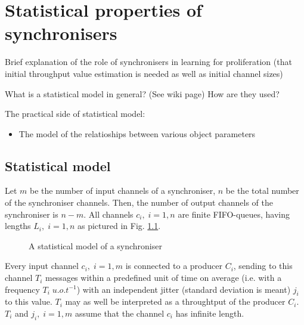 \chapter{Statistical properties of synchronisers}
Brief explanation of the role of synchronisers in learning for proliferation (that initial throughput value estimation is needed as well as initial channel sizes)

What is a statistical model in general? (See wiki page) How are they used?

The practical side of statistical model:
  \begin{itemize}
  \item The model of the relatioships between various object parameters
  \end{itemize}


\section{Statistical model}
Let $m$ be the number of input channels of a synchroniser, $n$ be the total number of the synchroniser channels. Then, the number of output channels of the synchroniser is $n-m$. All channels $c_{i}, \; i = 1,n$ are finite FIFO-queues, having lengths $L_i, \; i = 1,n$ as pictured in Fig. \ref{fig:stat_mod}.

  \begin{figure}[h] %
  \scalebox{0.8}{
    
  }
  \caption{A statistical model of a synchroniser}
  \label{fig:stat_mod}
  \end{figure}


Every input channel $c_{i}, \; i = 1,m$ is connected to a producer $C_{i}$, sending to this channel $T_{i}$ messages within a predefined unit of time on average (i.e. with a frequency $T_{i} \; u.o.t^{-1}$) with an independent jitter (standard deviation is meant) $j_{i}$ to this value. $T_{i}$ may as well be interpreted as a throughtput of the producer $C_{i}$. $T_{i}$ and $j_{i}, \; i=1,m$ assume that the channel $c_{i}$ has infinite length.

